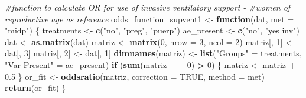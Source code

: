 \documentclass[
]{article}
\newenvironment{Shaded}{\begin{snugshade}}{\end{snugshade}}
\newcommand{\CommentTok}[1]{\textcolor[rgb]{0.56,0.35,0.01}{\textit{#1}}}
\newcommand{\ControlFlowTok}[1]{\textcolor[rgb]{0.13,0.29,0.53}{\textbf{#1}}}
\newcommand{\DataTypeTok}[1]{\textcolor[rgb]{0.13,0.29,0.53}{#1}}
\newcommand{\DecValTok}[1]{\textcolor[rgb]{0.00,0.00,0.81}{#1}}
\newcommand{\FloatTok}[1]{\textcolor[rgb]{0.00,0.00,0.81}{#1}}
\newcommand{\KeywordTok}[1]{\textcolor[rgb]{0.13,0.29,0.53}{\textbf{#1}}}
\newcommand{\NormalTok}[1]{#1}
\newcommand{\OperatorTok}[1]{\textcolor[rgb]{0.81,0.36,0.00}{\textbf{#1}}}
\newcommand{\OtherTok}[1]{\textcolor[rgb]{0.56,0.35,0.01}{#1}}
\newcommand{\StringTok}[1]{\textcolor[rgb]{0.31,0.60,0.02}{#1}}
\begin{document}
\begin{Shaded}
\begin{Highlighting}[]
\CommentTok{#function to calculate OR for use of invasive ventilatory support -}
\CommentTok{#women of reproductive age as reference}
\NormalTok{odds_function_supvent1 <-}\StringTok{ }\ControlFlowTok{function}\NormalTok{(dat, }\DataTypeTok{met =} \StringTok{"midp"}\NormalTok{) \{}
\NormalTok{  treatments <-}\StringTok{ }\KeywordTok{c}\NormalTok{(}\StringTok{"no"}\NormalTok{, }\StringTok{"preg"}\NormalTok{, }\StringTok{"puerp"}\NormalTok{)}
\NormalTok{  ae_present <-}\StringTok{ }\KeywordTok{c}\NormalTok{(}\StringTok{"no"}\NormalTok{, }\StringTok{"yes inv"}\NormalTok{)}
\NormalTok{  dat <-}\StringTok{ }\KeywordTok{as.matrix}\NormalTok{(dat)}
\NormalTok{  matriz <-}\StringTok{ }\KeywordTok{matrix}\NormalTok{(}\DecValTok{0}\NormalTok{, }\DataTypeTok{nrow =} \DecValTok{3}\NormalTok{, }\DataTypeTok{ncol =} \DecValTok{2}\NormalTok{)}
\NormalTok{  matriz[, }\DecValTok{1}\NormalTok{] <-}\StringTok{ }\NormalTok{dat[, }\DecValTok{3}\NormalTok{]}
\NormalTok{  matriz[, }\DecValTok{2}\NormalTok{] <-}\StringTok{ }\NormalTok{dat[, }\DecValTok{1}\NormalTok{]}
  \KeywordTok{dimnames}\NormalTok{(matriz) <-}\StringTok{ }\KeywordTok{list}\NormalTok{(}\StringTok{"Groups"}\NormalTok{ =}\StringTok{ }\NormalTok{treatments,}
                           \StringTok{"Var Present"}\NormalTok{ =}\StringTok{ }\NormalTok{ae_present)}
  \ControlFlowTok{if}\NormalTok{ (}\KeywordTok{sum}\NormalTok{(matriz }\OperatorTok{==}\StringTok{ }\DecValTok{0}\NormalTok{) }\OperatorTok{>}\StringTok{ }\DecValTok{0}\NormalTok{) \{}
\NormalTok{    matriz <-}\StringTok{ }\NormalTok{matriz }\OperatorTok{+}\StringTok{ }\FloatTok{0.5}
\NormalTok{  \}}
\NormalTok{  or_fit <-}\StringTok{ }\KeywordTok{oddsratio}\NormalTok{(matriz, }\DataTypeTok{correction =} \OtherTok{TRUE}\NormalTok{, }\DataTypeTok{method =}\NormalTok{ met)}
  \KeywordTok{return}\NormalTok{(or_fit)}
\NormalTok{\}}


\end{Highlighting}
\end{Shaded}
\end{document}
